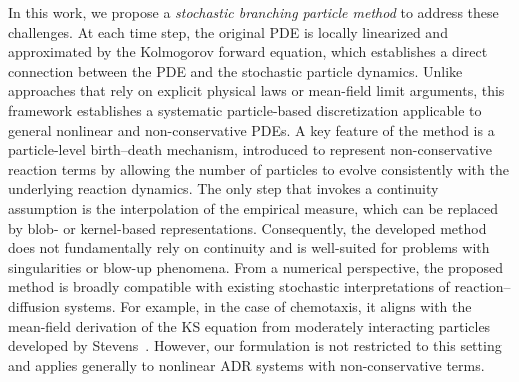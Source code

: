 \documentclass[a4paper,fleqn]{cas-sc}
\theoremstyle{definition}
\theoremstyle{remark}
\begin{document}
In this work, we propose a \textit{stochastic branching particle method} to address these challenges. 
At each time step, the original PDE is locally linearized and approximated by the Kolmogorov forward equation, which establishes a direct connection between the PDE and the stochastic particle dynamics.  Unlike approaches that rely on explicit physical laws or mean-field limit arguments, this framework establishes a systematic particle-based discretization applicable to general nonlinear and non-conservative PDEs. 
%
A key feature of the method is a particle-level birth–death mechanism, introduced to represent non-conservative reaction terms by allowing the number of particles to evolve consistently with the underlying reaction dynamics. The only step that invokes a continuity assumption is the interpolation of the empirical measure, which can be replaced by blob- or kernel-based representations. Consequently, the developed method does not fundamentally rely on continuity and is well-suited for problems with singularities or blow-up phenomena. 
%
From a numerical perspective, the proposed method is broadly compatible with existing stochastic interpretations of reaction–diffusion systems. For example, in the case of chemotaxis, it aligns with the mean-field derivation of the KS equation from moderately interacting particles developed by Stevens~\cite{Stevens_SIAM_2000}. However, our formulation is not restricted to this setting and applies generally to nonlinear ADR systems with non-conservative terms.

\end{document}
